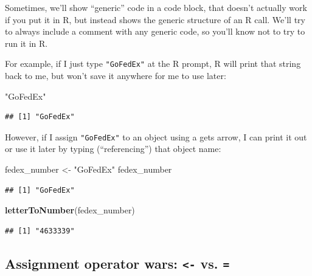 \documentclass[]{book}
\makeatletter
\newenvironment{Shaded}{\begin{snugshade}}{\end{snugshade}}
\newcommand{\KeywordTok}[1]{\textcolor[rgb]{0.13,0.29,0.53}{\textbf{{#1}}}}
\newcommand{\StringTok}[1]{\textcolor[rgb]{0.31,0.60,0.02}{{#1}}}
\newcommand{\NormalTok}[1]{{#1}}
\newenvironment{kframe}{%
\medskip{}
\setlength{\fboxsep}{.8em}
 \def\at@end@of@kframe{}%
 \ifinner\ifhmode%
  \def\at@end@of@kframe{\end{minipage}}%
  \begin{minipage}{\columnwidth}%
 \fi\fi%
 \def\FrameCommand##1{\hskip\@totalleftmargin \hskip-\fboxsep
 \colorbox{shadecolor}{##1}\hskip-\fboxsep
     \hskip-\linewidth \hskip-\@totalleftmargin \hskip\columnwidth}%
 \MakeFramed {\advance\hsize-\width
   \@totalleftmargin\z@ \linewidth\hsize
   \@setminipage}}%
 {\par\unskip\endMakeFramed%
 \at@end@of@kframe}
\renewenvironment{Shaded}{\begin{kframe}}{\end{kframe}}
\newenvironment{rmdblock}[1]
  {
  \begin{itemize}
  \renewcommand{\labelitemi}{
    \raisebox{-.7\height}[0pt][0pt]{
      {\setkeys{Gin}{width=3em,keepaspectratio}\texttt{[image: images/\#1]}}
    }
  }
  \setlength{\fboxsep}{1em}
  \begin{kframe}
  \item
  }
  {
  \end{kframe}
  \end{itemize}
  }
\newenvironment{rmdwarning}
  {\begin{rmdblock}{warning}}
  {\end{rmdblock}}
\makeatother
\begin{document}
\begin{rmdwarning}
Sometimes, we'll show ``generic'' code in a code block, that doesn't
actually work if you put it in R, but instead shows the generic
structure of an R call. We'll try to always include a comment with any
generic code, so you'll know not to try to run it in R.
\end{rmdwarning}

For example, if I just type \texttt{"GoFedEx"} at the R prompt, R will
print that string back to me, but won't save it anywhere for me to use
later:

\begin{Shaded}
\begin{Highlighting}[]
\StringTok{"GoFedEx"}
\end{Highlighting}
\end{Shaded}

\begin{verbatim}
## [1] "GoFedEx"
\end{verbatim}

However, if I assign \texttt{"GoFedEx"} to an object using a gets arrow,
I can print it out or use it later by typing (``referencing'') that
object name:

\begin{Shaded}
\begin{Highlighting}[]
\NormalTok{fedex_number <-}\StringTok{ "GoFedEx"}
\NormalTok{fedex_number}
\end{Highlighting}
\end{Shaded}

\begin{verbatim}
## [1] "GoFedEx"
\end{verbatim}

\begin{Shaded}
\begin{Highlighting}[]
\KeywordTok{letterToNumber}\NormalTok{(fedex_number)}
\end{Highlighting}
\end{Shaded}

\begin{verbatim}
## [1] "4633339"
\end{verbatim}

\subsection{\texorpdfstring{Assignment operator wars:
\texttt{\textless{}-} vs.
\texttt{=}}{Assignment operator wars: \textless{}- vs. =}}\label{assignment-operator-wars---vs.}
\end{document}

